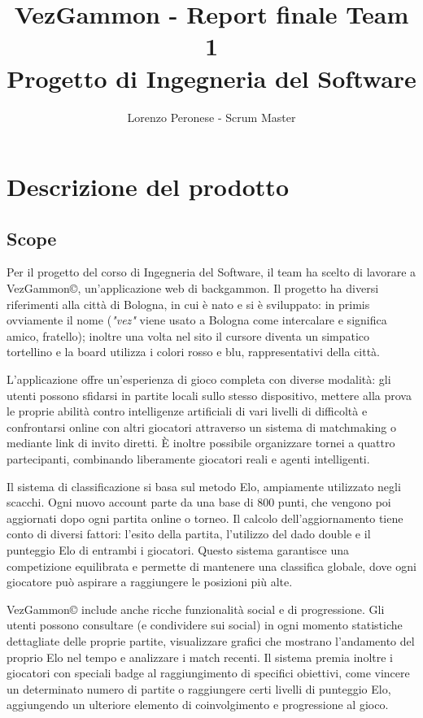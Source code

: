 \documentclass{article}
\title{VezGammon - Report finale Team 1 \\ \large Progetto di Ingegneria del Software}
\author{Lorenzo Peronese - Scrum Master}
\begin{document}
\maketitle

\tableofcontents

\newpage

\section{Descrizione del prodotto}
\subsection{Scope}
Per il progetto del corso di Ingegneria del Software, il team ha scelto di lavorare a VezGammon\copyright, un'applicazione web di backgammon. Il progetto ha diversi riferimenti 
alla città di Bologna, in cui è nato e si è sviluppato: in primis ovviamente il nome (\textit{"vez"} viene usato a Bologna come intercalare e significa amico, fratello); 
inoltre una volta nel sito il cursore diventa un simpatico tortellino e la board utilizza i colori rosso e blu, rappresentativi della città. \par
L'applicazione offre un'esperienza di gioco completa con diverse modalità: gli utenti possono sfidarsi in partite locali sullo stesso dispositivo, mettere alla prova 
le proprie abilità contro intelligenze artificiali di vari livelli di difficoltà e confrontarsi online con altri giocatori attraverso un sistema di matchmaking 
o mediante link di invito diretti. È inoltre possibile organizzare tornei a quattro partecipanti, combinando liberamente giocatori reali e agenti intelligenti. \par
Il sistema di classificazione si basa sul metodo Elo, ampiamente utilizzato negli scacchi. Ogni nuovo account parte da una base di 800 punti, che vengono poi 
aggiornati dopo ogni partita online o torneo. Il calcolo dell'aggiornamento tiene conto di diversi fattori: l'esito della partita, l'utilizzo del dado double 
e il punteggio Elo di entrambi i giocatori. Questo sistema garantisce una competizione equilibrata e permette di mantenere una classifica globale, 
dove ogni giocatore può aspirare a raggiungere le posizioni più alte. \par
VezGammon\copyright \: include anche ricche funzionalità social e di progressione. Gli utenti possono consultare (e condividere sui social) in ogni momento statistiche dettagliate delle proprie partite, 
visualizzare grafici che mostrano l'andamento del proprio Elo nel tempo e analizzare i match recenti. Il sistema premia inoltre i giocatori con speciali badge 
al raggiungimento di specifici obiettivi, come vincere un determinato numero di partite o raggiungere certi livelli di punteggio Elo, aggiungendo un ulteriore 
elemento di coinvolgimento e progressione al gioco.
\end{document}
